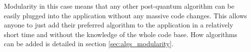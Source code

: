 Modularity in this case means that any other post-quantum algorithm can be easily plugged into the application without any massive code changes. This allows anyone to just add their preferred algorithm to the application in a relatively short time and without the knowledge of the whole code base. How algorithms can be added is detailed in section \ref{sec:algs_modularity}.
